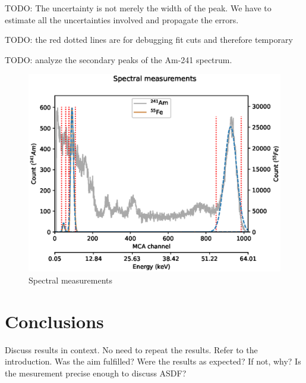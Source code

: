 \documentclass[a4paper]{article}
\newenvironment{todo}{
\color{red}
}
{
}
\begin{document}
\begin{todo}
TODO: The uncertainty is not merely the width of the peak. We have to estimate all the uncertainties involved and propagate the errors.

TODO: the red dotted lines are for debugging fit cuts and therefore temporary

TODO: analyze the secondary peaks of the Am-241 spectrum.
\end{todo}

\begin{figure}[ht!]
\centering
\includegraphics[width=\textwidth]{fig/python/spectra.eps}
\caption{Spectral measurements}
\label{fig:spectra}
\end{figure}


\clearpage
\section{Conclusions}
\label{conclusions}
Discuss results in context.
No need to repeat the results.
Refer to the introduction.
Was the aim fulfilled?
Were the results as expected? If not, why?
Is the mesurement precise enough to discuss ASDF?
\end{document}
